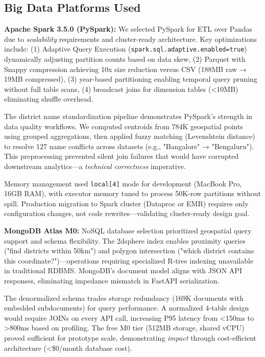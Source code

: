 \documentclass[10pt,a4paper]{article}
\begin{document}
\subsection{Big Data Platforms Used}

\textbf{Apache Spark 3.5.0 (PySpark):}
We selected PySpark for ETL over Pandas due to \textit{scalability} requirements and cluster-ready architecture. Key optimizations include: (1) Adaptive Query Execution (\texttt{spark.sql.adaptive.enabled=true}) dynamically adjusting partition counts based on data skew, (2) Parquet with Snappy compression achieving 10x size reduction versus CSV (188MB raw → 19MB compressed), (3) year-based partitioning enabling temporal query pruning without full table scans, (4) broadcast joins for dimension tables (<10MB) eliminating shuffle overhead.

The district name standardization pipeline demonstrates PySpark's strength in data quality workflows. We computed centroids from 784K geospatial points using grouped aggregations, then applied fuzzy matching (Levenshtein distance) to resolve 127 name conflicts across datasets (e.g., "Bangalore" → "Bengaluru"). This preprocessing prevented silent join failures that would have corrupted downstream analytics—a \textit{technical correctness} imperative.

Memory management used \texttt{local[4]} mode for development (MacBook Pro, 16GB RAM), with executor memory tuned to process 50K-row partitions without spill. Production migration to Spark cluster (Dataproc or EMR) requires only configuration changes, not code rewrites—validating cluster-ready design goal.

\textbf{MongoDB Atlas M0:}
NoSQL database selection prioritized geospatial query support and schema flexibility. The 2dsphere index enables proximity queries ("find districts within 50km") and polygon intersection ("which district contains this coordinate?")—operations requiring specialized R-tree indexing unavailable in traditional RDBMS. MongoDB's document model aligns with JSON API responses, eliminating impedance mismatch in FastAPI serialization.

The denormalized schema trades storage redundancy (169K documents with embedded subdocuments) for query performance. A normalized 4-table design would require JOINs on every API call, increasing P95 latency from <150ms to >800ms based on profiling. The free M0 tier (512MB storage, shared vCPU) proved sufficient for prototype scale, demonstrating \textit{impact} through cost-efficient architecture (<\$0/month database cost).
\end{document}

